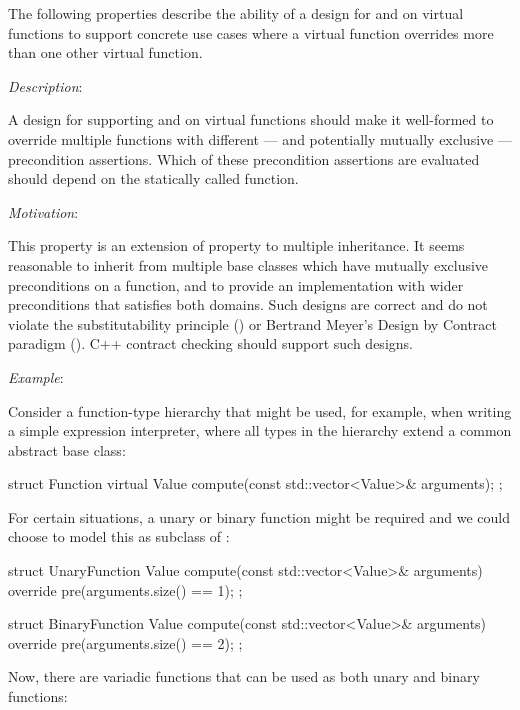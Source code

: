 The following properties describe the ability of a design  for  and  on virtual functions to support concrete use cases where a virtual function overrides more than one other virtual function.


\emph{Description}:

A design for supporting  and  on virtual functions should make it well-formed to override multiple functions with different --- and potentially mutually exclusive --- precondition assertions. Which of these precondition assertions are evaluated should depend on the statically called function. 

\emph{Motivation}:

This property is an extension of property  to multiple inheritance. It seems reasonable to inherit from multiple base classes which have mutually exclusive preconditions on a function, and to provide an implementation with wider preconditions that satisfies both domains. Such designs are correct and do not violate the substitutability principle () or Bertrand Meyer's Design by Contract paradigm ().  C++ contract checking should support such designs.

\emph{Example}:

Consider a function-type hierarchy that might be used, for example, when writing
a simple expression interpreter, where all types in the hierarchy extend a common abstract base
class:

\begin{codeblock}
struct Function {
  virtual Value compute(const std::vector<Value>& arguments);
};
\end{codeblock}

For certain situations, a unary or binary function might be required and we could choose to model
this as subclass of :

\begin{codeblock}
struct UnaryFunction {
  Value compute(const std::vector<Value>& arguments) override
    pre(arguments.size() == 1);
};

struct BinaryFunction {
  Value compute(const std::vector<Value>& arguments) override
    pre(arguments.size() == 2);
};
\end{codeblock}

Now, there are variadic functions that can be used as both unary and binary functions:

